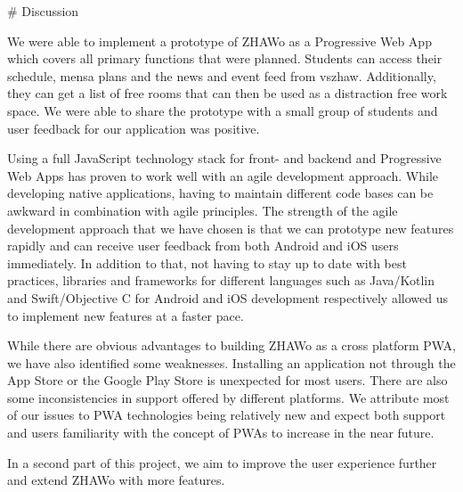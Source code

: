 \begin{markdown}

# Discussion

We were able to implement a prototype of ZHAWo as a Progressive Web App which covers all primary functions that were planned. Students can access their schedule, mensa plans and the news and event feed from vszhaw. Additionally, they can get a list of free rooms that can then be used as a distraction free work space. We were able to share the prototype with a small group of students and user feedback for our application was positive.

Using a full JavaScript technology stack for front- and backend and Progressive Web Apps has proven to work well with an agile development approach. While developing native applications, having to maintain different code bases can be awkward in combination with agile principles. The strength of the agile development approach that we have chosen is that we can prototype new features rapidly and can receive user feedback from both Android and iOS users immediately. In addition to that, not having to stay up to date with best practices, libraries and frameworks for different languages such as Java/Kotlin and Swift/Objective C for Android and iOS development respectively allowed us to implement new features at a faster pace.

While there are obvious advantages to building ZHAWo as a cross platform PWA, we have also identified some weaknesses. Installing an application not through the App Store or the Google Play Store is unexpected for most users. There are also some inconsistencies in support offered by different platforms. We attribute most of our issues to PWA technologies being relatively new and expect both support and users familiarity with the concept of PWAs to increase in the near future.

In a second part of this project, we aim to improve the user experience further and extend ZHAWo with more features.

\end{markdown}
